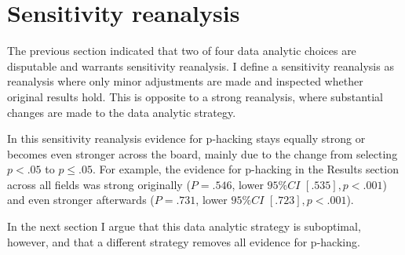 \section{Sensitivity reanalysis}
The previous section indicated that two of four data analytic choices are disputable and warrants sensitivity reanalysis. I define a sensitivity reanalysis as reanalysis where only minor adjustments are made and inspected whether original results hold. This is opposite to a strong reanalysis, where substantial changes are made to the data analytic strategy.

In this sensitivity reanalysis evidence for p-hacking stays equally strong or becomes even stronger across the board, mainly due to the change from selecting $p<.05$ to $p\leq.05$. For example, the evidence for p-hacking in the Results section across all fields was strong originally ($P=.546$, lower $95\%CI$ $[.535],p<.001$) and even stronger afterwards ($P=.731$, lower $95\%CI$ $[.723],p<.001$).

In the next section I argue that this data analytic strategy is suboptimal, however, and that a different strategy removes all evidence for p-hacking.